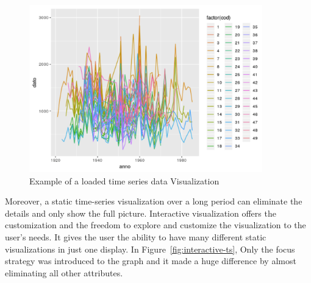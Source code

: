 \begin{figure}[H]
\centering
\captionsetup{justification=centering}
\includegraphics[width=0.9\textwidth]{./pics/loadedl.png}
\caption{Example of a loaded time series data Visualization \cite{loadedtimeseries}}
\label{fig:loaded-lines}
\end{figure}

Moreover, a static time-series visualization over a long period can eliminate the details and only show the full picture.
Interactive visualization offers the customization and the freedom to explore and customize the visualization to the user's needs. It gives the user the ability to have many different static visualizations in just one display. In Figure~\ref{fig:interactive-ts}, Only the focus strategy was introduced to the graph and it made a huge difference by almost eliminating all other attributes. 

